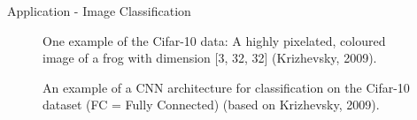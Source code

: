 \begin{vbframe}{Application - Image Classification}
\begin{figure}
        \caption{One example of the Cifar-10 data: A highly pixelated, coloured image of a frog with dimension [3, 32, 32] (Krizhevsky, 2009). }
    \end{figure}
\framebreak
    \begin{figure}
        \centering
        \caption{An example of a CNN architecture for classification on the Cifar-10 dataset (FC = Fully Connected) (based on Krizhevsky, 2009).}
    \end{figure}  
\end{vbframe}

